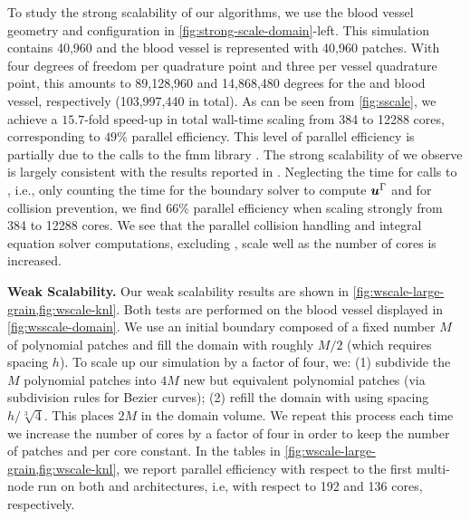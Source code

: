 To study the strong scalability of our algorithms, we use the blood vessel
geometry and \rbc configuration in
\cref{fig:strong-scale-domain}-left.
This simulation contains 40,960 \rbcs and the blood vessel is
represented with 40,960 patches.
With four degrees of freedom per \rbc quadrature point and three per vessel
quadrature point, this amounts to
89,128,960 and 14,868,480 degrees for the \rbcs and blood vessel, respectively 
(103,997,440 in total).
As can be seen from \cref{fig:sscale}, we achieve a $15.7$-fold
speed-up in total wall-time scaling from 384 to 12288 cores,
corresponding to $49\%$ parallel efficiency.  This level of  parallel
efficiency is partially due to the calls to the fmm library
\pvfmm. The strong scalability of \pvfmm we observe is largely
consistent with the results reported in \cite{malhotra2016algorithm}.
Neglecting the time for calls to \fmm, i.e., only counting the time
for the boundary solver to compute ${\bm{u}}^\Gamma$ and for collision
prevention, we find $66$\%
parallel efficiency when scaling strongly from 384 to 12288 cores.
We see that the parallel collision handling and integral equation solver
computations, excluding \fmm, scale well as the number of cores is increased.

\textbf{Weak Scalability. }\label{ss:weak}
Our weak scalability results are shown in
\cref{fig:wscale-large-grain,fig:wscale-knl}.
Both tests are performed on the blood vessel displayed in
\cref{fig:wsscale-domain}.
We use an initial boundary composed of a fixed number $M$ of polynomial
patches and fill the domain with roughly $M/2$ \rbcs (which requires spacing
$h$).
To scale up our simulation by a factor of four, we: (1) subdivide the $M$ polynomial
patches into $4M$ new but equivalent polynomial patches (via subdivision rules
for Bezier curves); (2) refill the domain with \rbcs using spacing 
$h/\sqrt[3]{4}$. This places $2M$ \rbcs in the domain volume.
We repeat this process each time we increase the number of cores by a factor of
four in order to keep the number of patches and \rbcs per core constant.
In the tables in  \cref{fig:wscale-large-grain,fig:wscale-knl},
we report parallel efficiency with respect to the
first multi-node run on both \skx and \knl architectures, i.e, with
respect to 192 and 136 cores, respectively.

